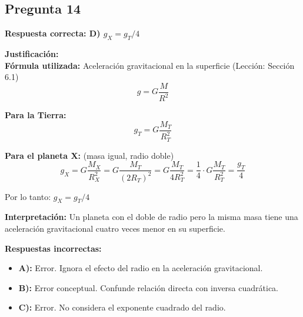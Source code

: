 \begin{respuestabox}
\subsection{Pregunta 14}
\textcolor{verdecorrecto}{\textbf{Respuesta correcta: D) $g_X = g_T/4$}}

\textbf{Justificación:}\\
\textbf{Fórmula utilizada:} Aceleración gravitacional en la superficie (Lección: Sección 6.1)
$$g = G\frac{M}{R^2}$$

\textbf{Para la Tierra:}
$$g_T = G\frac{M_T}{R_T^2}$$

\textbf{Para el planeta X:} (masa igual, radio doble)
$$g_X = G\frac{M_X}{R_X^2} = G\frac{M_T}{(2R_T)^2} = G\frac{M_T}{4R_T^2} = \frac{1}{4} \cdot G\frac{M_T}{R_T^2} = \frac{g_T}{4}$$

Por lo tanto: $g_X = g_T/4$

\textbf{Interpretación:} Un planeta con el doble de radio pero la misma masa tiene una aceleración gravitacional cuatro veces menor en su superficie.

\textbf{Respuestas incorrectas:}
\begin{itemize}
    \item \textbf{A):} Error. Ignora el efecto del radio en la aceleración gravitacional.
    \item \textbf{B):} Error conceptual. Confunde relación directa con inversa cuadrática.
    \item \textbf{C):} Error. No considera el exponente cuadrado del radio.
\end{itemize}
\end{respuestabox}
\newpage
